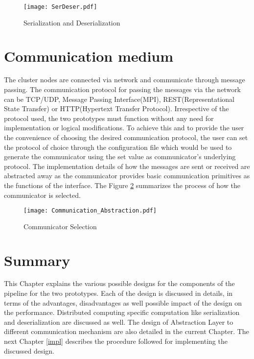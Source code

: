 \begin{figure}[!t]
\centering
\texttt{[image: SerDeser.pdf]}
\caption{Serialization and Deserialization}
\label{fig:SerDeser}
\end{figure}

\section{Communication medium}

The cluster nodes are connected via network and communicate through message passing. The communication protocol for passing the messages via the network can be TCP/UDP, Message Passing Interface(MPI), REST(Representational State Transfer) or HTTP(Hypertext Transfer Protocol). Irrespective of the protocol used, the two prototypes must function without any need for implementation or logical modifications. To achieve this and to provide the user the convenience of choosing the desired communication protocol, the user can set the protocol of choice through the configuration file which would be used to generate the communicator using the set value as communicator's underlying protocol. The implementation details of how the messages are sent or received are abstracted away as the communicator provides basic communication primitives as the functions of the interface. The Figure \ref{fig:CommAbs} summarizes the process of how the communicator is selected.

\begin{figure}[!t]
\centering
\texttt{[image: Communication\_Abstraction.pdf]}
\caption{Communicator Selection}
\label{fig:CommAbs}
\end{figure}

\section{Summary}

This Chapter explains the various possible designs for the components of the pipeline for the two prototypes. Each of the design is discussed in details, in terms of the advantages, disadvantages as well possible impact of the design on the performance. Distributed computing specific computation like serialization and deserialization are discussed as well. The design of Abstraction Layer to different communication mechanism are also detailed in the current Chapter. The next Chapter \ref{impl} describes the procedure followed for implementing the discussed design. 

\clearpage